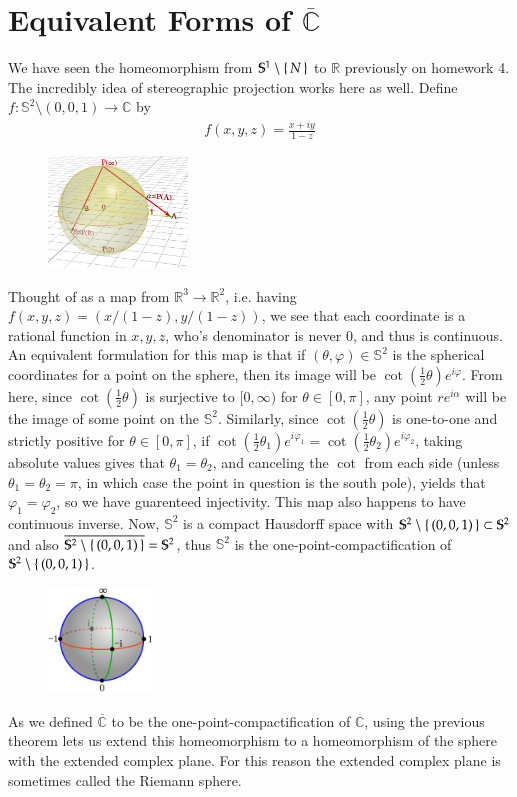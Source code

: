 \documentclass[12pt]{article}
\theoremstyle{definitionstyle}
\def\mbb#1{\mathbb{#1}}
\def \C{\mbb{C}}
\def \R{\mbb{R}}
\def \cph{\varphi}
\renewcommand{\S}{\mbb S}
\begin{document}
	\section{Equivalent Forms of $\overline{\C}$}
	We have seen the homeomorphism from $\S^1 \setminus \set{N}$ to $\R$ previously on homework 4. The incredibly idea of stereographic projection works here as well. Define $f: \S^2 \setminus{(0,0,1)} \to \C$ by 
	\begin{align*}
		f(x, y, z) = \frac{x+iy}{1-z}
	\end{align*}
	\begin{figure} %
		\includegraphics[width=0.33\textwidth]{projection}
	\end{figure}
	Thought of as a map from $\R^3 \to \R^2$, i.e. having $f(x, y, z) = (x/(1-z), y/(1-z))$, we see that each coordinate is a rational function in $x, y, z$, who's denominator is never 0, and thus is continuous. An equivalent formulation for this map is that if $(\theta, \cph) \in \S^2$ is the spherical coordinates for a point on the sphere, then its image will be $\cot(\frac12 \theta)e^{i\cph}$. From here, since $\cot(\frac 12 \theta)$ is surjective to $[0, \infty)$ for $\theta \in [0, \pi]$, any point $re^{i\alpha}$ will be the image of some point on the $\S^2$. Similarly, since $\cot(\frac12 \theta)$ is one-to-one and strictly positive for $\theta \in [0, \pi]$, if $\cot(\frac12 \theta_1) e^{i\cph_1} = \cot(\frac12 \theta_2) e^{i\cph_2}$, taking absolute values gives that $\theta_1 = \theta_2$, and canceling the $\cot$ from each side (unless $\theta_1 = \theta_2 = \pi$, in which case the point in question is the south pole), yields that $\cph_1 = \cph_2$, so we have guarenteed injectivity. This map also happens to have continuous inverse. Now, $\S^2$ is a compact Hausdorff space with $\S^2 \setminus \set{(0, 0, 1)} \subset \S^2$ and also $\overline{\S^2 \setminus \set{(0, 0, 1)}} = \S^2$, thus $\S^2$ is the one-point-compactification of $\S^2 \setminus \set{(0, 0, 1)}$. 
	\begin{figure} %
		\includegraphics[width=0.25\textwidth]{riemannsphere}
	\end{figure}
	As we defined $\overline{\C}$ to be the one-point-compactification of $\C$, using the previous theorem lets us extend this homeomorphism to a homeomorphism of the sphere with the extended complex plane. For this reason the extended complex plane is sometimes called the Riemann sphere.
	
\end{document}
